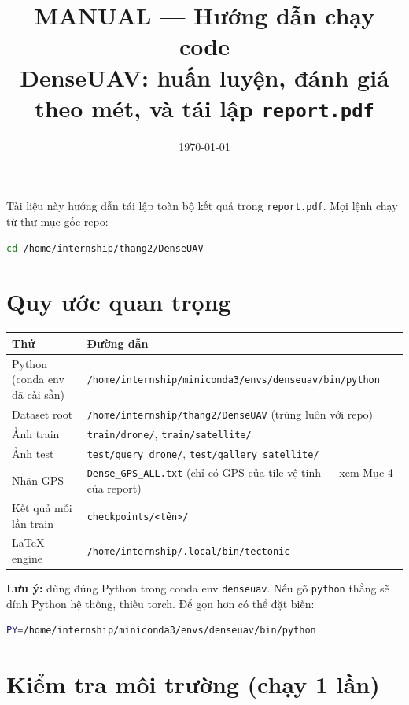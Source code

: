 \documentclass[11pt]{article}
\title{\textbf{MANUAL --- Hướng dẫn chạy code}\\[0.3em]
\large DenseUAV: huấn luyện, đánh giá theo mét, và tái lập \texttt{report.pdf}}
\author{}
\date{\today}
\newcommand{\cmd}[1]{\texttt{\footnotesize #1}}
\begin{document}
\maketitle

Tài liệu này hướng dẫn tái lập toàn bộ kết quả trong \texttt{report.pdf}. Mọi lệnh chạy từ thư mục gốc repo:

\begin{lstlisting}[language=bash]
cd /home/internship/thang2/DenseUAV
\end{lstlisting}

\section{Quy ước quan trọng}

\begin{center}
\begin{tabularx}{\textwidth}{lL}
\toprule
\textbf{Thứ} & \textbf{Đường dẫn} \\
\midrule
Python (conda env đã cài sẵn) & \cmd{/home/internship/miniconda3/envs/denseuav/bin/python} \\
Dataset root & \cmd{/home/internship/thang2/DenseUAV} (trùng luôn với repo) \\
Ảnh train & \cmd{train/drone/}, \cmd{train/satellite/} \\
Ảnh test & \cmd{test/query\_drone/}, \cmd{test/gallery\_satellite/} \\
Nhãn GPS & \cmd{Dense\_GPS\_ALL.txt} (chỉ có GPS của tile vệ tinh --- xem Mục 4 của report) \\
Kết quả mỗi lần train & \cmd{checkpoints/<tên>/} \\
LaTeX engine & \cmd{/home/internship/.local/bin/tectonic} \\
\bottomrule
\end{tabularx}
\end{center}

\textbf{Lưu ý:} dùng đúng Python trong conda env \texttt{denseuav}. Nếu gõ \texttt{python} thẳng sẽ dính Python hệ thống, thiếu torch. Để gọn hơn có thể đặt biến:

\begin{lstlisting}[language=bash]
PY=/home/internship/miniconda3/envs/denseuav/bin/python
\end{lstlisting}

\section{Kiểm tra môi trường (chạy 1 lần)}
\end{document}

